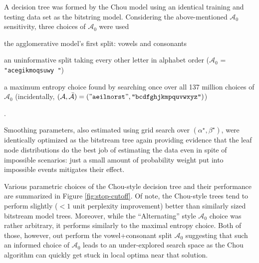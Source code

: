 \documentclass[12pt]{article}
\begin{document}
A decision tree was formed by the Chou model using an identical
training and testing data set as the bitstring model. Considering the
above-mentioned $\mathcal{A}_0$ sensitivity, three choices of
$\mathcal{A}_0$ were used \begin{inparaenum} 
\item the agglomerative model's first split: vowels and consonants
\item an uninformative split taking every other letter in alphabet
  order ($\mathcal{A}_0$ = \texttt{"acegikmoqsuwy "})
\item a maximum entropy choice found by searching once over all 137
  million choices of $\mathcal{A}_0$ (incidentally, $(\mathcal{A},
  \bar{\mathcal{A}}) = (\mathtt{"aeilnorst
    "},\texttt{"bcdfghjkmpquvwxyz"})$)
\end{inparaenum}. 

Smoothing parameters, also estimated using grid search over
$(\alpha^\star, \beta^\star)$, were identically optimized as the
bitstream tree again providing evidence that the leaf node
distributions do the best job of estimating the data even in spite of
impossible scenarios: just a small amount of probability weight put
into impossible events mitigates their effect.

Various parametric choices of the Chou-style decision tree and their
performance are summarized in Figure \ref{fig:stop-cutoff}. Of note,
the Chou-style trees tend to perform slightly ($< 1$ unit perplexity
improvement) better than similarly sized bitstream model
trees. Moreover, while the ``Alternating'' style $\mathcal{A}_0$
choice was rather arbitrary, it performs similarly to the maximal
entropy choice. Both of those, however, out perform the
vowel+consonant split $\mathcal{A}_0$ suggesting that such an informed
choice of $\mathcal{A}_0$ leads to an under-explored search space as
the Chou algorithm can quickly get stuck in local optima near that
solution.
\end{document}
